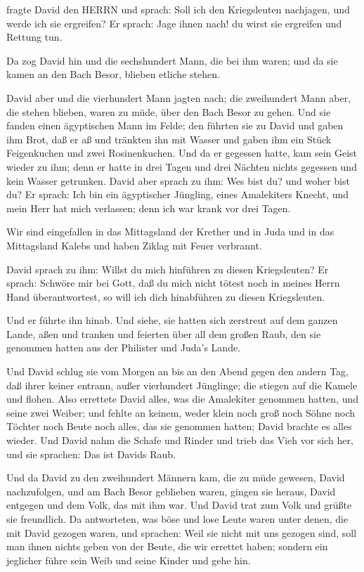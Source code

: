  fragte David den HERRN und sprach: Soll ich den
Kriegsleuten nachjagen, und werde ich sie ergreifen? Er sprach: Jage
ihnen nach! du wirst sie ergreifen und Rettung tun.

 Da zog David hin und die sechshundert Mann, die bei ihm
waren; und da sie kamen an den Bach Besor, blieben etliche stehen.

 David aber und die vierhundert Mann jagten nach; die
zweihundert Mann aber, die stehen blieben, waren zu müde, über den Bach
Besor zu gehen.  Und sie fanden einen ägyptischen Mann im
Felde; den führten sie zu David und gaben ihm Brot, daß er aß und
tränkten ihn mit Wasser  und gaben ihm ein Stück
Feigenkuchen und zwei Rosinenkuchen. Und da er gegessen hatte, kam sein
Geist wieder zu ihm; denn er hatte in drei Tagen und drei Nächten nichts
gegessen und kein Wasser getrunken.  David aber sprach zu
ihm: Wes bist du? und woher bist du? Er sprach: Ich bin ein ägyptischer
Jüngling, eines Amalekiters Knecht, und mein Herr hat mich verlassen;
denn ich war krank vor drei Tagen.

 Wir sind eingefallen in das Mittagsland der Krether und in
Juda und in das Mittagsland Kalebs und haben Ziklag mit Feuer verbrannt.

 David sprach zu ihm: Willst du mich hinführen zu diesen
Kriegsleuten? Er sprach: Schwöre mir bei Gott, daß du mich nicht tötest
noch in meines Herrn Hand überantwortest, so will ich dich hinabführen
zu diesen Kriegsleuten.

 Und er führte ihn hinab. Und siehe, sie hatten sich
zerstreut auf dem ganzen Lande, aßen und tranken und feierten über all
dem großen Raub, den sie genommen hatten aus der Philister und Juda's
Lande.

 Und David schlug sie vom Morgen an bis an den Abend gegen
den andern Tag, daß ihrer keiner entrann, außer vierhundert Jünglinge;
die stiegen auf die Kamele und flohen.  Also errettete
David alles, was die Amalekiter genommen hatten, und seine zwei Weiber;
 und fehlte an keinem, weder klein noch groß noch Söhne
noch Töchter noch Beute noch alles, das sie genommen hatten; David
brachte es alles wieder.  Und David nahm die Schafe und
Rinder und trieb das Vieh vor sich her, und sie sprachen: Das ist Davids
Raub.

 Und da David zu den zweihundert Männern kam, die zu müde
gewesen, David nachzufolgen, und am Bach Besor geblieben waren, gingen
sie heraus, David entgegen und dem Volk, das mit ihm war. Und David trat
zum Volk und grüßte sie freundlich.  Da antworteten, was
böse und lose Leute waren unter denen, die mit David gezogen waren, und
sprachen: Weil sie nicht mit uns gezogen sind, soll man ihnen nichts
geben von der Beute, die wir errettet haben; sondern ein jeglicher führe
sein Weib und seine Kinder und gehe hin.

